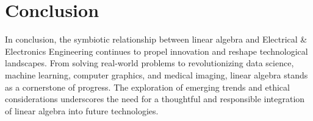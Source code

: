 \section{Conclusion}
In conclusion, the symbiotic relationship between linear algebra and Electrical \& Electronics Engineering continues to propel innovation and reshape technological landscapes. From solving real-world problems to revolutionizing data science, machine learning, computer graphics, and medical imaging, linear algebra stands as a cornerstone of progress. The exploration of emerging trends and ethical considerations underscores the need for a thoughtful and responsible integration of linear algebra into future technologies.
